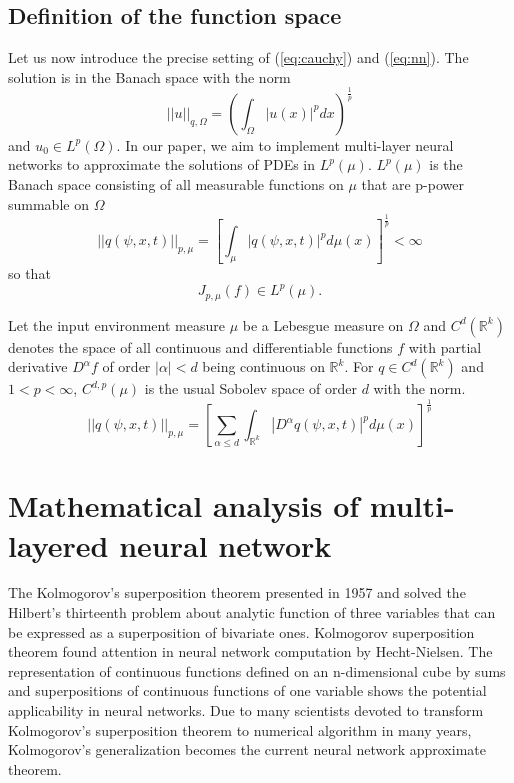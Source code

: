 \documentclass{article}
\begin{document}
		\subsection{Definition of the function space}
		Let us now introduce the precise setting of (\ref{eq:cauchy}) and (\ref{eq:nn}).
The solution is in the Banach space with the norm
		\begin{equation}
		||u||_{q,\Omega} = \left(\int_{\Omega} |u(x)|^{p} dx\right)^{\frac{1}{p}}
		\end{equation}
		and $u_{0} \in L^{p}(\Omega)$.
In our paper, we aim to implement multi-layer neural networks to approximate the solutions of PDEs in $L^{p}(\mu)$.
$L^{p}(\mu)$ is the Banach space consisting of all measurable functions on $\mu$ that are p-power summable on $\Omega$
		\begin{equation}
		||q(\psi,x,t)||_{p,\mu} = \left[\int_{\mu} |q(\psi,x,t)|^{p} d\mu(x)\right]^{\frac{1}{p}} < \infty
		\end{equation}
		so that
		\begin{equation}
		J_{p,\mu}(f)  \in L^{p}(\mu).
		\end{equation}

		Let the input environment measure $\mu$ be a Lebesgue measure on $\Omega$
and $C^{d}(\mathbb{R}^{k})$ denotes the space of all continuous
and differentiable functions $f$ with partial derivative $D^{\alpha}f$ of order $|\alpha| < d$ being continuous on $\mathbb{R}^{k}$.
For $q \in C^{d}(\mathbb{R}^{k})$ and $1 < p < \infty$, $C^{d,p}(\mu)$ is the usual Sobolev space of order $d$ with the norm.
		\begin{equation}
||q(\psi,x,t)||_{p,\mu} = \left[ \sum_{\alpha \leq d} \int_{\mathbb{R}^{k}} |D^{\alpha}q(\psi,x,t)|^{p} d \mu(x)\right]^{\frac{1}{p}}
		\end{equation}



\section{Mathematical analysis of multi-layered neural network}
 The Kolmogorov's superposition theorem presented in 1957 and solved the Hilbert's thirteenth problem \footnotemark about analytic function of three variables that can be expressed as a superposition of bivariate ones.
Kolmogorov superposition theorem found attention in neural network computation by Hecht{-}Nielsen\cite{nielsen}.
The representation of continuous functions defined on an n{-}dimensional cube by sums and superpositions of continuous functions of one variable shows the potential applicability in neural networks\cite{kurkova}.
Due to many scientists devoted to transform Kolmogorov's superposition theorem to numerical algorithm in many years,
Kolmogorov's generalization becomes the current neural network approximate theorem.
\end{document}
